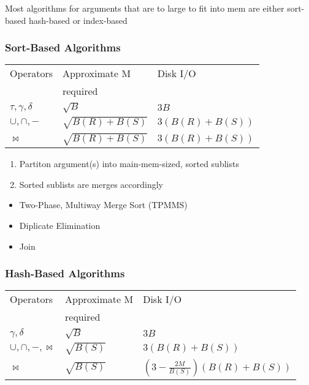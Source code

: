 \documentclass[11pt]{article}
\begin{document}
   Most algorithms for arguments that are to large to fit into mem are
   either sort-based hash-based or index-based
\subsubsection{Sort-Based Algorithms}
\label{sec-12.5.1}


\begin{center}
\begin{tabular}{lll}
 Operators              &  Approximate M       &  Disk I/O        \\
                        &  required            &                  \\
\hline
 $\tau,\gamma, \delta$  &  $\sqrt{B}$          &  $3B$            \\
 $\cup,\cap,-$          &  $\sqrt{B(R)+B(S)}$  &  $3(B(R)+B(S))$  \\
 $\bowtie$              &  $\sqrt{B(R)+B(S)}$  &  $3(B(R)+B(S))$  \\
\end{tabular}
\end{center}


\begin{enumerate}
\item Partiton argument(s) into main-mem-sized, sorted sublists
\item Sorted sublists are merges accordingly
\end{enumerate}
\begin{itemize}

\item Two-Phase, Multiway Merge Sort (TPMMS)\\
\label{sec-12.5.1.1}


\item Diplicate Elimination\\
\label{sec-12.5.1.2}


\item Join\\
\label{sec-12.5.1.3}

\end{itemize} %
\subsubsection{Hash-Based Algorithms}
\label{sec-12.5.2}


\begin{center}
\begin{tabular}{lll}
 Operators                 &  Approximate M  &  Disk I/O                          \\
                           &  required       &                                    \\
\hline
 $\gamma, \delta$          &  $\sqrt{B}$     &  $3B$                              \\
 $\cup, \cap, -, \bowtie$  &  $\sqrt{B(S)}$  &  $3(B(R)+B(S))$                    \\
 $\bowtie$                 &  $\sqrt{B(S)}$  &  $(3-\frac{2M}{B(S)})(B(R)+B(S))$  \\
\end{tabular}
\end{center}
\end{document}
